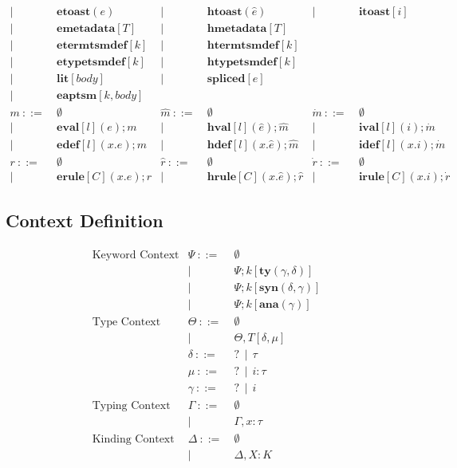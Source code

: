 \documentclass[letterpaper, notitlepage]{article}
\begin{document}
\[\begin{array}{rlrlrl}
				| ~ &~ \mathbf{etoast}(e)     			& 		 	| ~ &~	\mathbf{htoast}(\hat{e})				& 		 	| ~ &~	\mathbf{itoast}[i]\\
				| ~ &~ \mathbf{emetadata}[T]     		& 		 	| ~ &~	\mathbf{hmetadata}[T]\\
				| ~ &~ \mathbf{etermtsmdef}[k]     		&			| ~ &~ 	\mathbf{htermtsmdef}[k]\\
				| ~ &~ \mathbf{etypetsmdef}[k]			& 			| ~ &~ 	\mathbf{htypetsmdef}[k]\\
				| ~ &~ \mathbf{lit}[body]					& 		 	| ~ &~ 	\mathbf{spliced}[e]\\
				| ~ &~ \mathbf{eaptsm}[k,body]\\
	m 			~::=&~ \emptyset						&\hat{m}	~::=&~ \emptyset								&\dot{m}	~::=&~ \emptyset\\
				| ~ &~ \mathbf{eval}[l](e);m 			&			| ~ &~ \mathbf{hval}[l](\hat{e});\hat{m} 		&			| ~ &~ \mathbf{ival}[l](i);\dot{m}\\
				| ~ &~ \mathbf{edef}[l](x.e);m 			&			| ~ &~ \mathbf{hdef}[l](x.\hat{e});\hat{m}		&			| ~ &~ \mathbf{idef}[l](x.i);\dot{m}\\
	r 			~::=&~ \emptyset 						&\hat{r} 	~::=&~ \emptyset 								&\dot{r} 	~::=&~ \emptyset\\
				| ~ &~ \mathbf{erule}[C](x.e);r 		& 			| ~ &~ \mathbf{hrule}[C](x.\hat{e});\hat{r} 	&			| ~ &~ \mathbf{irule}[C](x.i);\dot{r}
\end{array}
\]
\subsection{Context Definition}
\[
\begin{array}{rrl}
\text{Keyword Context}	&	\Psi 	~::=&~ 	\emptyset\\
						&			| ~ &~ 	\Psi;k[\mathbf{ty}(\gamma,\delta)]\\
						&			| ~ &~ 	\Psi;k[\mathbf{syn}(\delta,\gamma)]\\
						&			| ~ &~ 	\Psi;k[\mathbf{ana}(\gamma)]\\
\text{Type Context}		&	\Theta 	~::=&~ \emptyset\\
						&			| ~ &~ \Theta,T[\delta,\mu] \\
						&	\delta 	~::=&~ ? ~~ | ~~ \tau\\
						&	\mu	   	~::=&~ ? ~~ | ~~ i:\tau\\
						& 	\gamma  ~::=&~ ? ~~ | ~~ i\\
\text{Typing Context}	&	\Gamma 	~::=&~ \emptyset\\
						&			| ~ &~ \Gamma,x:\tau\\
\text{Kinding Context}	& 	\Delta	~::=&~ \emptyset\\
						& 			| ~ &~ \Delta,X:K\\
\end{array}
\]
\end{document}
